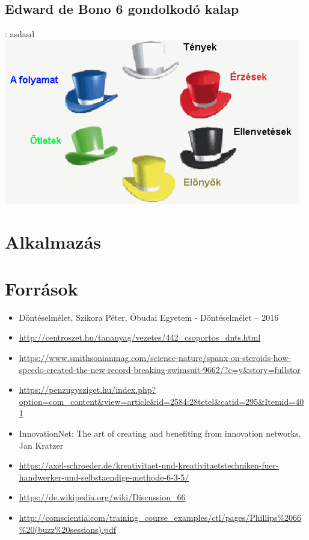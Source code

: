 \documentclass{beamer}
\begin{document}
\subsection{Edward de Bono 6 gondolkodó kalap}
\begin{frame}{\secname : \subsecname}
    asdasd
\includegraphics[scale=0.4]{figures/hatkalap.png}
\end{frame}

\section{Alkalmazás}
\begin{frame}
\end{frame}


\section*{Források}
\begin{frame}{\secname}
    \begin{itemize}
        \item Döntéselmélet, Szikora Péter, Óbudai Egyetem - Döntéselmélet – 2016
        \item \url{http://centroszet.hu/tananyag/vezetes/442_csoportos_dnts.html}
        \item \url{https://www.smithsonianmag.com/science-nature/spanx-on-steroids-how-speedo-created-the-new-record-breaking-swimsuit-9662/?c=y&story=fullstor}
        \item \url{https://penzugysziget.hu/index.php?option=com_content&view=article&id=2584:28tetel&catid=295&Itemid=401}
        \item InnovationNet: The art of creating and benefiting from innovation networks, Jan Kratzer
        \item \url{https://axel-schroeder.de/kreativitaet-und-kreativitaetstechniken-fuer-handwerker-und-selbstaendige-methode-6-3-5/}
        \item \url{https://de.wikipedia.org/wiki/Discussion_66}
        \item \url{http://comscientia.com/training_course_examples/ctl/pages/Phillips\%2066\%20(buzz\%20sessions).pdf}
    \end{itemize}
\end{frame}
\end{document}

